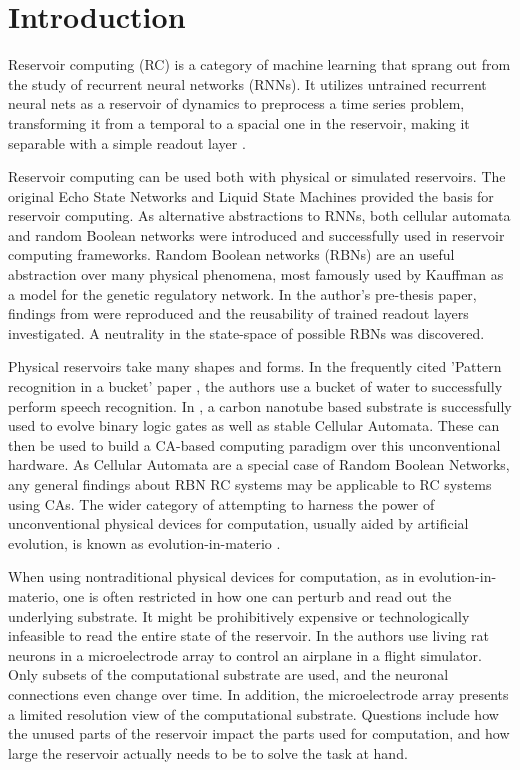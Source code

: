 \chapter{Introduction}

Reservoir computing (RC) is a category of machine learning that sprang out from the study of recurrent neural networks (RNNs).
It utilizes untrained recurrent neural nets as a reservoir of dynamics to preprocess a time series problem,
transforming it from a temporal to a spacial one in the reservoir,
making it separable with a simple readout layer \cite{lukovsevivcius2012reservoir}.

Reservoir computing can be used both with physical or simulated reservoirs.
The original Echo State Networks \cite{jaeger2002adaptive} and Liquid State Machines \cite{natschlager2002liquid} provided the basis for reservoir computing.
As alternative abstractions to RNNs,
both cellular automata \cite{yilmaz2014reservoir} and random Boolean networks \cite{rbn-reservoir} were introduced and successfully used in reservoir computing frameworks.
Random Boolean networks (RBNs) \cite{gershenson2004introduction} are an useful abstraction over many physical phenomena,
most famously used by Kauffman \cite{kauffman1969metabolic} as a model for the genetic regulatory network.
In the author's pre-thesis paper,
findings from \cite{rbn-reservoir} were reproduced and the reusability of trained readout layers investigated.
A neutrality in the state-space of possible RBNs was discovered.

Physical reservoirs take many shapes and forms.
In the frequently cited 'Pattern recognition in a bucket' paper \cite{fernando2003pattern},
the authors use a bucket of water to successfully perform speech recognition.
In \cite{farstad2015evolving},
a carbon nanotube based substrate is successfully used to evolve binary logic gates as well as stable Cellular Automata.
These can then be used to build a CA-based computing paradigm over this unconventional hardware.
As Cellular Automata are a special case of Random Boolean Networks,
any general findings about RBN RC systems may be applicable to RC systems using CAs.
The wider category of attempting to harness the power of unconventional physical devices for computation,
usually aided by artificial evolution,
is known as evolution-in-materio \cite{miller2002evolution}.

When using nontraditional physical devices for computation, as in evolution-in-materio,
one is often restricted in how one can perturb and read out the underlying substrate.
It might be prohibitively expensive or technologically infeasible to read the entire state of the reservoir.
In \cite{demarse2005adaptive} the authors use living rat neurons in a microelectrode array to control an airplane in a flight simulator.
Only subsets of the computational substrate are used,
and the neuronal connections even change over time.
In addition, the microelectrode array presents a limited resolution view of the computational substrate.
Questions include how the unused parts of the reservoir impact the parts used for computation,
and how large the reservoir actually needs to be to solve the task at hand.

